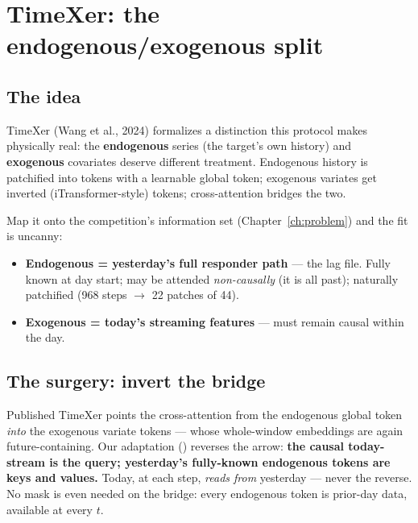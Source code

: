 \section{TimeXer: the endogenous/exogenous split}

\subsection{The idea}

TimeXer (Wang et al., 2024) formalizes a distinction this protocol makes
physically real: the \textbf{endogenous} series (the target's own history)
and \textbf{exogenous} covariates deserve different treatment. Endogenous
history is patchified into tokens with a learnable global token;
exogenous variates get inverted (iTransformer-style) tokens;
cross-attention bridges the two.

Map it onto the competition's information set
(Chapter~\ref{ch:problem}) and the fit is uncanny:

\begin{itemize}
\item \textbf{Endogenous = yesterday's full responder path} --- the lag
  file. Fully known at day start; may be attended \emph{non-causally}
  (it is all past); naturally patchified (968 steps $\to$ 22 patches of
  44).
\item \textbf{Exogenous = today's streaming features} --- must remain
  causal within the day.
\end{itemize}

\subsection{The surgery: invert the bridge}

Published TimeXer points the cross-attention from the endogenous global
token \emph{into} the exogenous variate tokens --- whose whole-window
embeddings are again future-containing. Our adaptation
() reverses the arrow: \textbf{the causal today-stream
is the query; yesterday's fully-known endogenous tokens are keys and
values.} Today, at each step, \emph{reads from} yesterday --- never the
reverse. No mask is even needed on the bridge: every endogenous token is
prior-day data, available at every $t$.

